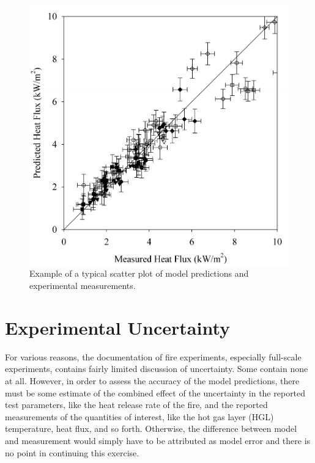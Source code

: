 \begin{figure}[t]
\begin{center}
\includegraphics[height=3.in]{FIGURES/scatterplot}
\end{center}
\caption[Sample scatter plot.]{Example of a typical scatter plot of model predictions and experimental measurements.}
\label{scatterplot}
\end{figure}





\section{Experimental Uncertainty}

For various reasons, the documentation of fire experiments, especially full-scale experiments,
contains fairly limited discussion of uncertainty. Some contain none at all.
However, in order to assess the accuracy of the model predictions, there must be some estimate of the
combined effect of the uncertainty in the reported test parameters, like the heat release rate of the fire,
and the reported measurements of the quantities of interest, like the hot gas layer (HGL)
temperature, heat flux, and so forth. Otherwise, the difference between model and measurement would simply have to be attributed as model error and there is no point in
continuing this exercise.

